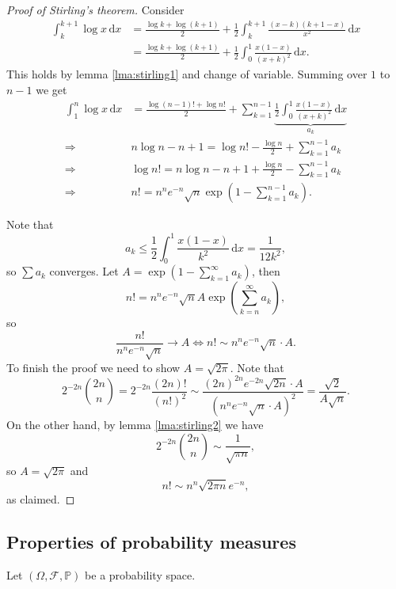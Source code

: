 \begin{proof}[Proof of Stirling's theorem]
    Consider 
    \begin{align*}
        \int_{k}^{k+1} \log x \,\mathrm{d}x &= \frac{\log k+ \log (k+1)}{2} + \frac{1}{2} \int_{k}^{k+1} \frac{(x-k)(k+1-x)}{x^2} \,\mathrm{d}x\\ 
        &= \frac{\log k+ \log (k+1)}{2} + \frac{1}{2} \int_{0}^{1} \frac{x(1-x)}{(x+k)^2} \,\mathrm{d}x.
    \end{align*}
    This holds by lemma \ref{lma:stirling1} and change of variable. Summing over $1$ to $n-1$ we get 
    \begin{align*}
        \int_{1}^{n} \log x \,\mathrm{d}x &= \frac{\log(n-1)!+\log n!}{2} + \sum_{k=1}^{n-1}\underbrace{\frac{1}{2}\int_{0}^{1} \frac{x(1-x)}{(x+k)^2} \,\mathrm{d}x}_{a_k}\\ 
        \Longrightarrow &n\log n-n+1 = \log n! - \frac{\log n}{2} + \sum_{k=1}^{n-1}a_k\\ 
        \Longrightarrow & \log n! = n\log n-n+1+\frac{\log n}{2}-\sum_{k=1}^{n-1}a_k\\ 
        \Longrightarrow & n! = n^n e^{-n} \sqrt{n} \exp\left( 1- \sum_{k=1}^{n-1}a_k\right).
    \end{align*}

    Note that 
    \[
        a_k\le \frac{1}{2}\int_{0}^{1} \frac{x(1-x)}{k^2} \,\mathrm{d}x = \frac{1}{12k^2},
    \]
    so $ \sum a_k$ converges. Let $ A = \exp\left( 1- \sum_{k=1}^{\infty}a_k\right) $, then 
    \[
        n! = n^n e^{-n} \sqrt{n} A \exp \left( \sum_{k=n}^{\infty}a_k \right),
    \]
    so 
    \[
        \frac{n!}{n^n e^{-n} \sqrt{n}} \to A \Longleftrightarrow n! \sim n^n e^{-n} \sqrt{n}\cdot A.
    \]
    To finish the proof we need to show $ A=\sqrt{2\pi} $. Note that 
    \[
        2^{-2n}\binom{2n}{n} = 2^{-2n}\frac{(2n)!}{(n!)^2}\sim \frac{(2n)^{2n} e^{-2n} \sqrt{2n}\cdot A}{(n^n e^{-n} \sqrt{n}\cdot A)^2} = \frac{\sqrt{2}}{A\sqrt{n}}.
    \]
    On the other hand, by lemma \ref{lma:stirling2} we have 
    \[
        2^{-2n}\binom{2n}{n}\sim \frac{1}{\sqrt{\pi n}},
    \]
    so $ A=\sqrt{2\pi} $ and
    \[
        n! \sim n^n \sqrt{2\pi n}e^{-n},
    \]
    as claimed.
\end{proof}

\subsection{Properties of probability measures}

Let $ (\Omega,\mathcal{F},\mathbb{P}) $ be a probability space.

